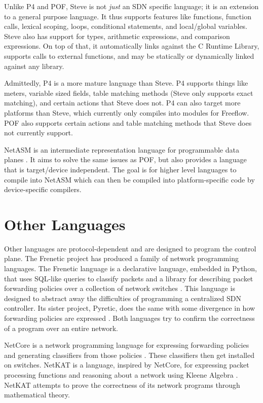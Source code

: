 Unlike P4 and POF, Steve is not \textit{just} an SDN specific language; it is an
extension to a general purpose language. It thus supports features like
functions, function calls, lexical scoping, loops, conditional statements, and
local/global variables. Steve also has support for types, arithmetic
expressions, and comparison expressions. On top of that, it automatically links
against the C Runtime Library, supports calls to external functions, and may be
statically or dynamically linked against any library.

Admittedly, P4 is a more mature language than Steve. P4 supports things like
meters, variable sized fields, table matching methods (Steve only supports exact
matching), and certain actions that Steve does not. P4 can also target more
platforms than Steve, which currently only compiles into modules for Freeflow.
POF also supports certain actions and table matching methods that Steve does not
currently support.

NetASM is an intermediate representation language for programmable data planes
\cite{shahbaz2015netasm}. It aims to solve the same issues as POF, but also provides a language that is target/device independent. The goal is for higher level languages to compile into NetASM which can then be compiled into platform-specific code by device-specific compilers.

\section{Other Languages} \label{rel:frenetic}

Other languages are protocol-dependent and are designed to program the control plane. The Frenetic project has produced a family of network programming
languages. The Frenetic language is a declarative language, embedded in Python,
that uses SQL-like queries to classify packets and a library for describing
packet forwarding policies over a collection of network switches
\cite{foster2011frenetic, foster2013frenetic}. This language is designed to
abstract away the difficulties of programming a centralized SDN controller. Its
sister project, Pyretic, does the same with some divergence in how forwarding
policies are expressed \cite{modularpyretic}. Both languages try to confirm the correctness of a program over an entire network.

NetCore is a network programming language for expressing forwarding policies and
generating classifiers from those policies \cite{monsanto2012netcore}. These
classifiers then get installed on switches. NetKAT is a language, inspired by
NetCore, for expressing packet processing functions and reasoning about a
network using Kleene Algebra \cite{kozen2014netkat, anderson2014netkat}. NetKAT
attempts to prove the correctness of its network programs through mathematical theory.
